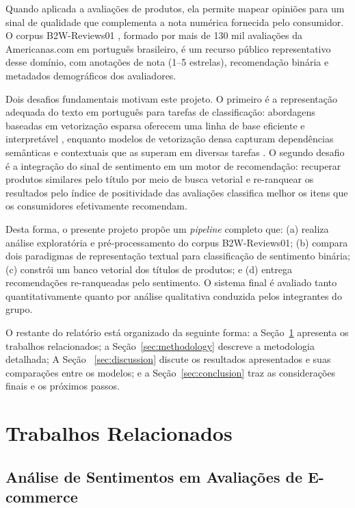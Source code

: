 \documentclass{IEEEtran}
\begin{document}
Quando aplicada a avaliações de produtos, ela permite mapear opiniões para um sinal de qualidade que complementa a nota numérica fornecida pelo consumidor. O corpus B2W-Reviews01 \cite{real2019b2w}, formado por mais de 130 mil avaliações da Americanas.com em português brasileiro, é um recurso público representativo desse domínio, com anotações de nota (1--5 estrelas), recomendação binária e metadados demográficos dos avaliadores.

Dois desafios fundamentais motivam este projeto. O primeiro é a representação adequada do texto em português para tarefas de classificação: abordagens baseadas em vetorização esparsa oferecem uma linha de base eficiente e interpretável \cite{BPLN_livro_4ed:2026}, enquanto modelos de vetorização densa capturam dependências semânticas e contextuais que as superam em diversas tarefas \cite{jm3}. O segundo desafio é a integração do sinal de sentimento em um motor de recomendação: recuperar produtos similares pelo título por meio de busca vetorial e re-ranquear os resultados pelo índice de positividade das avaliações classifica melhor os itens que os consumidores efetivamente recomendam.

Desta forma, o presente projeto propõe um \textit{pipeline} completo que: (a) realiza análise exploratória e pré-processamento do corpus B2W-Reviews01; (b) compara dois paradigmas de representação textual para classificação de sentimento binária; (c) constrói um banco vetorial dos títulos de produtos; e (d) entrega recomendações re-ranqueadas pelo sentimento. O sistema final é avaliado tanto quantitativamente quanto por análise qualitativa conduzida pelos integrantes do grupo.

O restante do relatório está organizado da seguinte forma: a Seção~\ref{sec:related} apresenta os trabalhos relacionados; a Seção~\ref{sec:methodology} descreve a metodologia detalhada; A Seção ~\ref{sec:discussion} discute os resultados apresentados e suas comparações entre os modelos; e a Seção~\ref{sec:conclusion} traz as considerações finais e os próximos passos.

\section{Trabalhos Relacionados}
\label{sec:related}

\subsection{Análise de Sentimentos em Avaliações de E-commerce}
\end{document}
